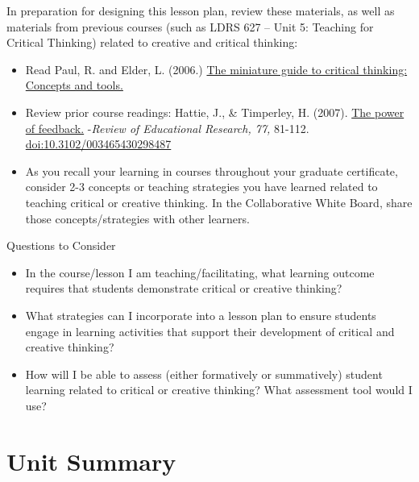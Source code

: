 \documentclass[
]{book}
\providecommand{\tightlist}{%
  \setlength{\itemsep}{0pt}\setlength{\parskip}{0pt}}
\begin{document}
\begin{reflect}
In preparation for designing this lesson plan, review these materials, as well as materials from previous courses (such as LDRS 627 -- Unit 5: Teaching for Critical Thinking) related to creative and critical thinking:

\begin{itemize}
\tightlist
\item
  Read Paul, R. and Elder, L. (2006.) \href{https://www.criticalthinking.org/files/Concepts_Tools.pdf}{The miniature guide to critical thinking: Concepts and tools.}\\
\item
  Review prior course readings: Hattie, J., \& Timperley, H. (2007). \href{http://education.qld.gov.au/staff/development/performance/resources/readings/power-feedback.pdf}{The power of feedback.} -\emph{Review of Educational Research, 77,} 81-112. \url{doi:10.3102/003465430298487}\\
\item
  As you recall your learning in courses throughout your graduate certificate, consider 2-3 concepts or teaching strategies you have learned related to teaching critical or creative thinking. In the Collaborative White Board, share those concepts/strategies with other learners.
\end{itemize}

{Questions to Consider}

\begin{itemize}
\tightlist
\item
  In the course/lesson I am teaching/facilitating, what learning outcome requires that students demonstrate critical or creative thinking?\\
\item
  What strategies can I incorporate into a lesson plan to ensure students engage in learning activities that support their development of critical and creative thinking?\\
\item
  How will I be able to assess (either formatively or summatively) student learning related to critical or creative thinking? What assessment tool would I use?
\end{itemize}
\end{reflect}

\hypertarget{unit-summary-2}{%
\section*{Unit Summary}\label{unit-summary-2}}
\end{document}
